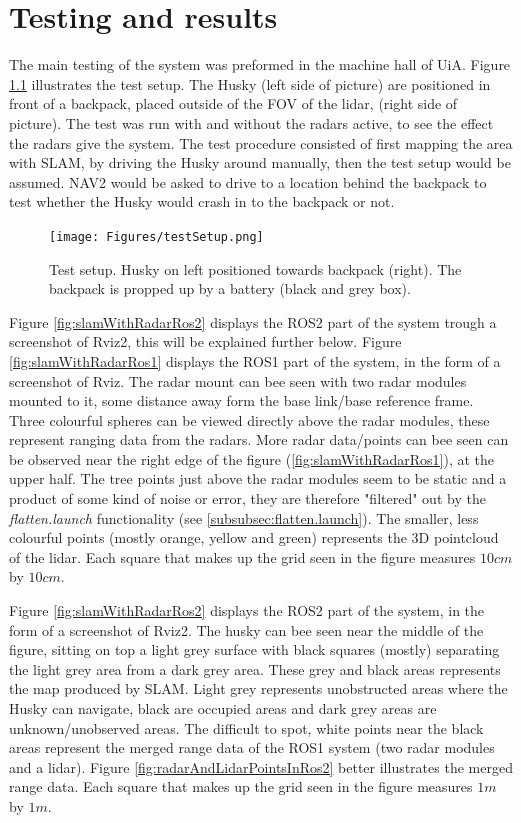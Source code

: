 \chapter{Testing and results}\label{chap:TestingAndResults}
The main testing of the system was preformed in the machine hall of UiA. Figure \ref{fig:testSetup} illustrates the test setup. The Husky (left side of picture) are positioned in front of a backpack, placed outside of the FOV of the lidar, (right side of picture). The test was run with and without the radars active, to see the effect the radars give the system. The test procedure consisted of first mapping the area with SLAM, by driving the Husky around manually, then the test setup would be assumed. NAV2 would be asked to drive to a location behind the backpack to test whether the Husky would crash in to the backpack or not. 

\begin{figure}[H]
    \centering
    \texttt{[image: Figures/testSetup.png]}
    \caption{Test setup. Husky on left positioned towards backpack (right). The backpack is propped up by a battery (black and grey box).}
    \label{fig:testSetup}
\end{figure}

Figure \ref{fig:slamWithRadarRos2} displays the ROS2 part of the system trough a screenshot of Rviz2, this will be explained further below. Figure \ref{fig:slamWithRadarRos1} displays the ROS1 part of the system, in the form of a screenshot of Rviz. The radar mount can bee seen with two radar modules mounted to it, some distance away form the base link/base reference frame. Three colourful spheres can be viewed directly above the radar modules, these represent ranging data from the radars. More radar data/points can bee seen can be observed near the right edge of the figure (\ref{fig:slamWithRadarRos1}), at the upper half. The tree points just above the radar modules seem to be static and a product of some kind of noise or error, they are therefore "filtered" out by the \textit{flatten.launch} functionality (see \ref{subsubsec:flatten.launch}). The smaller, less colourful points (mostly orange, yellow and green) represents the 3D pointcloud of the lidar. Each square that makes up the grid seen in the figure measures $10 cm$ by $10 cm$. 

Figure \ref{fig:slamWithRadarRos2} displays the ROS2 part of the system, in the form of a screenshot of Rviz2. The husky can bee seen near the middle of the figure, sitting on top a light grey surface with black squares (mostly) separating the light grey area from a dark grey area. These grey and black areas represents the map produced by SLAM. Light grey represents unobstructed areas where the Husky can navigate, black are occupied areas and dark grey areas are unknown/unobserved areas. The difficult to spot, white points near the black areas represent the merged range data of the ROS1 system (two radar modules and a lidar). Figure \ref{fig:radarAndLidarPointsInRos2} better illustrates the merged range data. Each square that makes up the grid seen in the figure measures $1 m$ by $1 m$.

